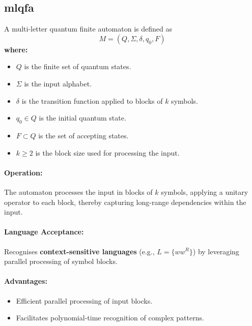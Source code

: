 

\subsection{\acrfull{mlqfa}}
\label{subsec:ml-qfa}
\begin{definition}
A multi-letter quantum finite automaton is defined as 
\[
M = (Q, \Sigma, \delta, q_0, F)
\]
\textbf{where:}
\begin{itemize}
    \item \( Q \) is the finite set of quantum states.
    \item \( \Sigma \) is the input alphabet.
    \item \( \delta \) is the transition function applied to blocks of \( k \) symbols.
    \item \( q_0 \in Q \) is the initial quantum state.
    \item \( F \subset Q \) is the set of accepting states.
    \item \( k \geq 2 \) is the block size used for processing the input.
\end{itemize}
\end{definition}

\paragraph{Operation:}  
The automaton processes the input in blocks of \( k \) symbols, applying a unitary operator to each block, thereby capturing long-range dependencies within the input.

\paragraph{Language Acceptance:}  
Recognises \textbf{context-sensitive languages} (e.g., \( L = \{ww^R\} \)) by leveraging parallel processing of symbol blocks.

\paragraph{Advantages:}
\begin{itemize}
    \item Efficient parallel processing of input blocks.
    \item Facilitates polynomial-time recognition of complex patterns.
\end{itemize}

